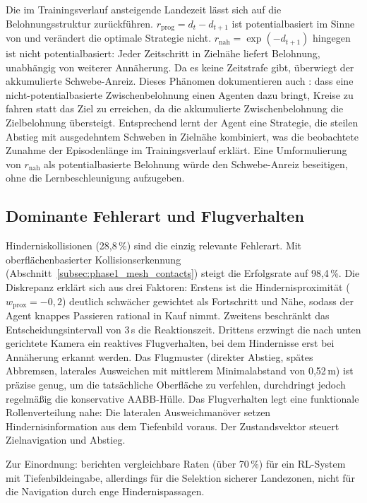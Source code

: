 Die im Trainingsverlauf ansteigende Landezeit lässt sich auf die
Belohnungsstruktur zurückführen. $r_{\mathrm{prog}} = d_{t} - d_{t+1}$
ist potentialbasiert im Sinne von
\textcite{ngPolicyInvarianceReward1999} und verändert die optimale
Strategie nicht. $r_{\mathrm{nah}} = \exp(-d_{t+1})$ hingegen ist
nicht potentialbasiert: Jeder Zeitschritt in Zielnähe liefert Belohnung,
unabhängig von weiterer Annäherung. Da es keine Zeitstrafe gibt, überwiegt
der akkumulierte Schwebe-Anreiz. Dieses Phänomen dokumentieren auch
\textcite{randlovLearningDriveBicycle1998}: dass eine nicht-potentialbasierte Zwischenbelohnung einen
Agenten dazu bringt, Kreise zu fahren statt das Ziel zu erreichen, da
die akkumulierte Zwischenbelohnung die Zielbelohnung übersteigt.
Entsprechend lernt der Agent eine Strategie, die steilen Abstieg mit
ausgedehntem Schweben in Zielnähe kombiniert, was die beobachtete
Zunahme der Episodenlänge im Trainingsverlauf erklärt. Eine Umformulierung 
von $r_{\text{nah}}$ als potentialbasierte Belohnung würde den Schwebe-Anreiz 
beseitigen, ohne die Lernbeschleunigung aufzugeben. 

\subsection{Dominante Fehlerart und Flugverhalten}

Hinderniskollisionen (28,8\,\%) sind die einzig relevante Fehlerart. Mit
oberflächenbasierter Kollisionserkennung
(Abschnitt~\ref{subsec:phase1_mesh_contacts}) steigt die Erfolgsrate auf
98,4\,\%. Die Diskrepanz erklärt sich aus drei Faktoren: Erstens ist die
Hindernisproximität ($w_{\mathrm{prox}} = -0{,}2$) deutlich schwächer
gewichtet als Fortschritt und Nähe, sodass der Agent knappes Passieren
rational in Kauf nimmt. Zweitens beschränkt das Entscheidungsintervall von
3\,s die Reaktionszeit. Drittens erzwingt die nach unten gerichtete Kamera
ein reaktives Flugverhalten, bei dem Hindernisse erst bei Annäherung
erkannt werden. Das Flugmuster (direkter Abstieg, spätes Abbremsen,
laterales Ausweichen mit mittlerem Minimalabstand von 0,52\,m) ist präzise
genug, um die tatsächliche Oberfläche zu verfehlen, durchdringt jedoch
regelmäßig die konservative AABB-Hülle. Das Flugverhalten
legt eine funktionale Rollenverteilung nahe: Die lateralen
Ausweichmanöver setzen Hindernisinformation aus dem Tiefenbild voraus.
Der Zustandsvektor steuert Zielnavigation und Abstieg.

Zur Einordnung: \textcite{bartolomeiAutonomousEmergencyLanding2022}
berichten vergleichbare Raten (über 70\,\%) für ein RL-System mit
Tiefenbildeingabe, allerdings für die Selektion sicherer Landezonen,
nicht für die Navigation durch enge Hindernispassagen. 

